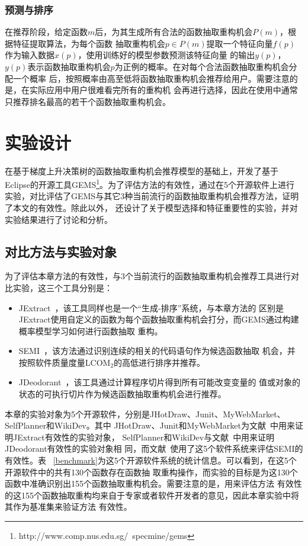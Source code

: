 \subsubsection{预测与排序}
在推荐阶段，给定函数$m$后，为其生成所有合法的函数抽取重构机会$P(m)$，根据特征提取算法，为每个函数
抽取重构机会$p\in P(m)$提取一个特征向量$f(p)$作为输入数据$x(p)$，使用训练好的模型参数预测该特征向量
的输出$y(p)$，$y(p)$表示函数抽取重构机会$p$为正例的概率。在对每个合法函数抽取重构机会分配一个概率
后，按照概率由高至低将函数抽取重构机会推荐给用户。需要注意的是，在实际应用中用户很难看完所有的重构机
会再进行选择，因此在使用中通常只推荐排名最高的若干个函数抽取重构机会。

\section{实验设计}
在基于梯度上升决策树的函数抽取重构机会推荐模型的基础上，开发了基于Eclipse的开源工具GEMS\footnote{http://www.comp.nus.edu.sg/~specmine/gems}。为了评估方法的有效性，通过在5个开源软件上进行
实验，对比评估了GEMS与其它3种当前流行的函数抽取重构机会推荐方法，证明了本文的有效性。除此以外，
还设计了关于模型选择和特征重要性的实验，并对实验结果进行了讨论和分析。

\subsection{对比方法与实验对象}
为了评估本章方法的有效性，与3个当前流行的函数抽取重构机会推荐工具进行对比实验，这三个工具分别是：
\begin{itemize}
  \item JExtract~\cite{silva:ICPC14,silva:CoRR15}，该工具同样也是一个``生成-排序''系统，与本章方法的
区别是JExtract使用自定义的函数为每个函数抽取重构机会打分，而GEMS通过构建概率模型学习如何进行函数抽取
重构。
  \item SEMI~\cite{charalampidou2016identifying}，该方法通过识别连续的相关的代码语句作为候选函数抽取
机会，并按照软件质量度量LCOM$_2$的高低进行排序并推荐。
  \item JDeodorant~\cite{tsantalis2011identification}，该工具通过计算程序切片得到所有可能改变变量的
  值或对象的状态的可执行切片作为候选函数抽取重构机会进行推荐。
\end{itemize}

本章的实验对象为5个开源软件，分别是JHotDraw、Junit、MyWebMarket、SelfPlanner和WikiDev。其中
JHotDraw、Junit和MyWebMarket为文献~\cite{silva:ICPC14}中用来证明JExtract有效性的实验对象，
SelfPlanner和WikiDev与文献~\cite{tsantalis2011identification}中用来证明JDeodorant有效性的实验对象相
同，而文献~\cite{charalampidou2016identifying}使用了这5个软件系统来评估SEMI的有效性。表
~\ref{benchmark}为这5个开源软件系统的统计信息。可以看到，在这5个开源软件中的共有130个函数存在函数抽
取重构操作，而实验的目标是为这130个函数中准确识别出155个函数抽取重构机会。需要注意的是，用来评估方法
有效性的这155个函数抽取重构均来自于专家或者软件开发者的意见，因此本章实验中将其作为基准集来验证方法
有效性。

